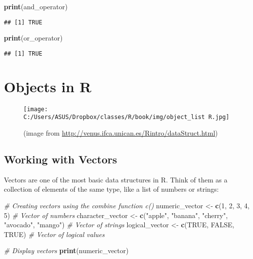 \documentclass[
]{book}
\newenvironment{Shaded}{\begin{snugshade}}{\end{snugshade}}
\newcommand{\CommentTok}[1]{\textcolor[rgb]{0.56,0.35,0.01}{\textit{#1}}}
\newcommand{\ConstantTok}[1]{\textcolor[rgb]{0.56,0.35,0.01}{#1}}
\newcommand{\DecValTok}[1]{\textcolor[rgb]{0.00,0.00,0.81}{#1}}
\newcommand{\FunctionTok}[1]{\textcolor[rgb]{0.13,0.29,0.53}{\textbf{#1}}}
\newcommand{\NormalTok}[1]{#1}
\newcommand{\OtherTok}[1]{\textcolor[rgb]{0.56,0.35,0.01}{#1}}
\newcommand{\StringTok}[1]{\textcolor[rgb]{0.31,0.60,0.02}{#1}}
\begin{document}
\begin{Shaded}
\begin{Highlighting}[]
\FunctionTok{print}\NormalTok{(and\_operator)}
\end{Highlighting}
\end{Shaded}

\begin{verbatim}
## [1] TRUE
\end{verbatim}

\begin{Shaded}
\begin{Highlighting}[]
\FunctionTok{print}\NormalTok{(or\_operator)}
\end{Highlighting}
\end{Shaded}

\begin{verbatim}
## [1] TRUE
\end{verbatim}

\section{Objects in R}\label{objects-in-r}

\begin{figure}
\centering
\texttt{[image: C:/Users/ASUS/Dropbox/classes/R/book/img/object\_list R.jpg]}
\caption{(image from \url{http://venus.ifca.unican.es/Rintro/dataStruct.html})}
\end{figure}

\subsection{Working with Vectors}\label{working-with-vectors}

Vectors are one of the most basic data structures in R. Think of them as a collection of elements of the same type, like a list of numbers or strings:

\begin{Shaded}
\begin{Highlighting}[]
\CommentTok{\# Creating vectors using the combine function c()}
\NormalTok{numeric\_vector }\OtherTok{\textless{}{-}} \FunctionTok{c}\NormalTok{(}\DecValTok{1}\NormalTok{, }\DecValTok{2}\NormalTok{, }\DecValTok{3}\NormalTok{, }\DecValTok{4}\NormalTok{, }\DecValTok{5}\NormalTok{)           }\CommentTok{\# Vector of numbers}
\NormalTok{character\_vector }\OtherTok{\textless{}{-}} \FunctionTok{c}\NormalTok{(}\StringTok{"apple"}\NormalTok{, }\StringTok{"banana"}\NormalTok{, }\StringTok{"cherry"}\NormalTok{, }\StringTok{"avocado"}\NormalTok{, }\StringTok{"mango"}\NormalTok{)  }\CommentTok{\# Vector of strings}
\NormalTok{logical\_vector }\OtherTok{\textless{}{-}} \FunctionTok{c}\NormalTok{(}\ConstantTok{TRUE}\NormalTok{, }\ConstantTok{FALSE}\NormalTok{, }\ConstantTok{TRUE}\NormalTok{)       }\CommentTok{\# Vector of logical values}

\CommentTok{\# Display vectors}
\FunctionTok{print}\NormalTok{(numeric\_vector)}
\end{Highlighting}
\end{Shaded}
\end{document}
